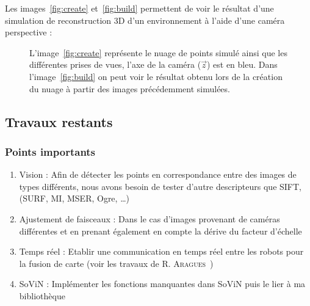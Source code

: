 \vspace{5mm}
Les images~\ref{fig:create} et~\ref{fig:build} permettent de voir le résultat d'une simulation de reconstruction 3D d'un environnement à l'aide d'une caméra perspective :
\begin{figure}[htp]
\begin{center}
\caption{L'image~\ref{fig:create} représente le nuage de points simulé ainsi que les différentes prises de vues, l'axe de la caméra ($\vec{z}$) est en bleu. Dans l'image~\ref{fig:build} on peut voir le résultat obtenu lors de la création du nuage à partir des images précédemment simulées.}
\end{center}
\end{figure}
\subsection{Travaux restants}

\subsubsection{Points importants}
\begin{enumerate}
\item Vision : Afin de détecter les points en correspondance entre des images de types différents, nous avons besoin de tester d'autre descripteurs que SIFT, (SURF, MI, MSER, Ogre, \dots)
\item Ajustement de faisceaux : Dans le cas d'images provenant de caméras différentes et en prenant également en compte la dérive du facteur d'échelle
\item Temps réel : Etablir une communication en temps réel entre les robots pour la fusion de carte (voir les travaux de R. \textsc{Aragues}~\cite{Aragues11PhD})
\item SoViN : Implémenter les fonctions manquantes dans SoViN puis le lier à ma bibliothèque 
\end{enumerate}


